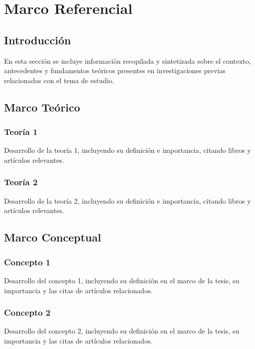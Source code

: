\section{Marco Referencial}
\label{sec:marco_referencial}

\subsection{Introducción}
\label{subsec:marco_introduccion}

En esta sección se incluye información recopilada y sintetizada sobre el contexto, antecedentes y fundamentos teóricos
presentes en investigaciones previas relacionadas con el tema de estudio.

\subsection{Marco Teórico}
\label{subsec:marco_teorico}

\subsubsection{Teoría 1}
\label{subsubsec:teoria-1}

Desarrollo de la teoría 1, incluyendo su definición e importancia, citando libros y artículos relevantes.

\subsubsection{Teoría 2}
\label{subsubsec:teoria-2}

Desarrollo de la teoría 2, incluyendo su definición e importancia, citando libros y artículos relevantes.

\subsection{Marco Conceptual}
\label{subsec:marco_conceptual}

\subsubsection{Concepto 1}
\label{subsubsec:concepto-1}

Desarrollo del concepto 1, incluyendo su definición en el marco de la tesis, su importancia y las citas de artículos relacionados.

\subsubsection{Concepto 2}
\label{subsubsec:concepto-2}

Desarrollo del concepto 2, incluyendo su definición en el marco de la tesis, su importancia y las citas de artículos relacionados.